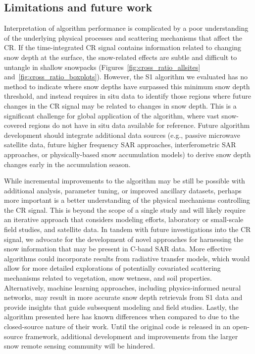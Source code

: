 \documentclass[journal abbreviation, manuscript]{copernicus}
\begin{document}
\subsection{Limitations and future work}

Interpretation of algorithm performance is complicated by a poor understanding of the underlying physical processes and scattering mechanisms that affect the CR. If the time-integrated CR signal contains information related to changing snow depth at the surface, the snow-related effects are subtle and difficult to untangle in shallow snowpacks (Figures~\ref{fig:cross_ratio_allsites} and~\ref{fig:cross_ratio_boxplots}). However, the S1 algorithm we evaluated has no method to indicate where snow depths have surpassed this minimum snow depth threshold, and instead requires in situ data to identify those regions where future changes in the CR signal may be related to changes in snow depth. This is a significant challenge for global application of the algorithm, where vast snow-covered regions do not have in situ data available for reference. Future algorithm development should integrate additional data sources (e.g., passive microwave satellite data, future higher frequency SAR approaches, interferometric SAR approaches, or physically-based snow accumulation models) to derive snow depth changes early in the accumulation season.

While incremental improvements to the algorithm may be still be possible with additional analysis, parameter tuning, or improved ancillary datasets, perhaps more important is a better understanding of the physical mechanisms controlling the CR signal. This is beyond the scope of a single study and will likely require an iterative approach that considers modeling efforts, laboratory or small-scale field studies, and satellite data. In tandem with future investigations into the CR signal, we advocate for the development of novel approaches for harnessing the snow information that may be present in C-band SAR data. More effective algorithms could incorporate results from radiative transfer models, which would allow for more detailed explorations of potentially covariated scattering mechanisms related to vegetation, snow wetness, and soil properties. Alternatively, machine learning approaches, including physics-informed neural networks, may result in more accurate snow depth retrievals from S1 data and provide insights that guide subsequent modeling and field studies. Lastly, the algorithm presented here has known differences when compared to \citet{Lievens.2022} due to the closed-source nature of their work. Until the original code is released in an open-source framework, additional development and improvements from the larger snow remote sensing community will be hindered.
\end{document}
